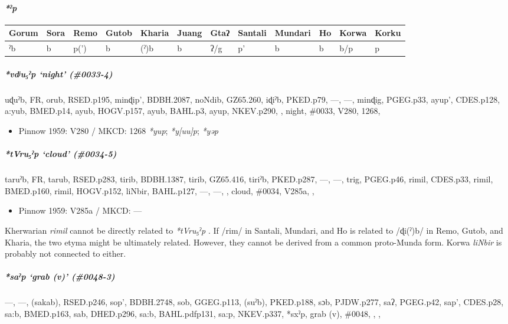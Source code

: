 \documentclass[a4paper,]{article}
\providecommand{\tightlist}{%
  \setlength{\itemsep}{0pt}\setlength{\parskip}{0pt}}
\let\oldparagraph\paragraph
\renewcommand{\paragraph}[1]{\oldparagraph{#1}\mbox{}}
\let\oldsubparagraph\subparagraph
\renewcommand{\subparagraph}[1]{\oldsubparagraph{#1}\mbox{}}
\begin{document}
\paragraph{\texorpdfstring{\emph{*ˀp}}{*ˀp}}\label{ux2c0p}

\begin{longtable}[]{@{}llllllllllll@{}}
\toprule
Gorum & Sora & Remo & Gutob & Kharia & Juang & Gtaʔ & Santali & Mundari
& Ho & Korwa & Korku\tabularnewline
\midrule
\endhead
ˀb & b & p(') & b & (ˀ)b & b & ʔ/g & p' & b & b & b/p & p\tabularnewline
\bottomrule
\end{longtable}

\subparagraph{\texorpdfstring{\emph{*vdʲu₅ˀp} `night'
(\#0033-4)}{*vdʲu₅ˀp night (\#0033-4)}}\label{vdux2b2uux2c0p-night-0033-4}

uɖuˀb, FR, orub, RSED.p195, minɖip', BDBH.2087, noNdib, GZ65.260, iɖiˀb,
PKED.p79, ---, ---, minɖig, PGEG.p33, ayup', CDES.p128, a:yub, BMED.p14,
ayub, HOGV.p157, ayub, BAHL.p3, ayup, NKEV.p290, , night, \#0033, V280,
1268,

\begin{itemize}
\tightlist
\item
  Pinnow 1959: V280 / MKCD: 1268 \emph{*yup}; \emph{*y{[}uu{]}p};
  \emph{*yəp}
\end{itemize}

\subparagraph{\texorpdfstring{\emph{*tVru₅ˀp} `cloud'
(\#0034-5)}{*tVru₅ˀp cloud (\#0034-5)}}\label{tvruux2c0p-cloud-0034-5}

taruˀb, FR, tarub, RSED.p283, tirib, BDBH.1387, tirib, GZ65.416, tiriˀb,
PKED.p287, ---, ---, trig, PGEG.p46, rimil, CDES.p33, rimil, BMED.p160,
rimil, HOGV.p152, liNbir, BAHL.p127, ---, ---, , cloud, \#0034, V285a, ,

\begin{itemize}
\tightlist
\item
  Pinnow 1959: V285a / MKCD: ---
\end{itemize}

Kherwarian \emph{rimil} cannot be directly related to \emph{*tVru₅ˀp} .
If /rim/ in Santali, Mundari, and Ho is related to /ɖi(ˀ)b/ in Remo,
Gutob, and Kharia, the two etyma might be ultimately related. However,
they cannot be derived from a common proto-Munda form. Korwa
\emph{liNbir} is probably not connected to either.

\subparagraph{\texorpdfstring{\emph{*saˀp} `grab (v)'
(\#0048-3)}{*saˀp grab (v) (\#0048-3)}}\label{saux2c0p-grab-v-0048-3}

---, ---, (sakab), RSED.p246, sop', BDBH.2748, sob, GGEG.p113, (suˀb),
PKED.p188, sɔb, PJDW.p277, saʔ, PGEG.p42, sap', CDES.p28, sa:b,
BMED.p163, sab, DHED.p296, sa:b, BAHL.pdfp131, sa:p, NKEV.p337, *sxˀp,
grab (v), \#0048, , ,
\end{document}
